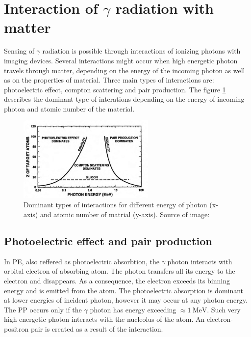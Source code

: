 \section{Interaction of $\gamma$ radiation with matter}
Sensing of $\gamma$ radiation is possible through interactions of ionizing photons with imaging devices.
Several interactions might occur when high energetic photon travels through matter, depending on the energy of the incoming photon as well as on the properties of material.
Three main types of interactions are: photoelectric effect, compton scattering and pair production.
The figure \ref{fig:dominant} describes the dominant type of interations depending on the energy of incoming photon and atomic number of the material.

\begin{figure}[!h]
  \centering 

    \includegraphics[width=0.6\textwidth]{./fig/photos/dominant.png}
  \caption{Dominant types of interactions for different energy of photon (x-axis) and atomic number of matrial (y-axis). Source of image: \cite{schwank}}
    \label{fig:dominant}
  
\end{figure}

\subsection{Photoelectric effect and pair production}
In \ac{PE}, also reffered as photoelectric absorbtion, the $\gamma$ photon interacts with orbital electron of absorbing atom.
The photon transfers all its energy to the electron and disappears.
As a consequence, the electron exceeds its binning energy and is emitted from the atom.
The photoelectric absorption is dominant at lower energies of incident photon, however it may occur at any photon energy.
The \ac{PP} occurs only if the $\gamma$ photon has energy exceeding $\approx \SI{1}{\mega\electronvolt}$.
Such very high energetic photon interacts with the nucleolus of the atom.
An electron-positron pair is created as a result of the interaction.

